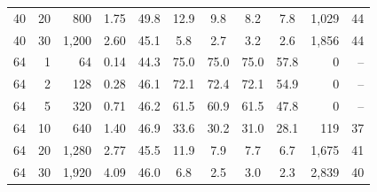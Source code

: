 {\begin{tabular}{@{}rrrr|ccccc|rr@{}}
40 & 20 & 800 & 1.75 & 49.8 & 12.9 & 9.8 & 8.2 & 7.8 & 1,029 & 44 \\
40 & 30 & 1,200 & 2.60 & 45.1 & 5.8 & 2.7 & 3.2 & 2.6 & 1,856 & 44 \\
64 & 1 & 64 & 0.14 & 44.3 & 75.0 & 75.0 & 75.0 & 57.8 & 0 & -- \\
64 & 2 & 128 & 0.28 & 46.1 & 72.1 & 72.4 & 72.1 & 54.9 & 0 & -- \\
64 & 5 & 320 & 0.71 & 46.2 & 61.5 & 60.9 & 61.5 & 47.8 & 0 & -- \\
64 & 10 & 640 & 1.40 & 46.9 & 33.6 & 30.2 & 31.0 & 28.1 & 119 & 37 \\
64 & 20 & 1,280 & 2.77 & 45.5 & 11.9 & 7.9 & 7.7 & 6.7 & 1,675 & 41 \\
64 & 30 & 1,920 & 4.09 & 46.0 & 6.8 & 2.5 & 3.0 & 2.3 & 2,839 & 40 \\
\hline
\end{tabular}}%
